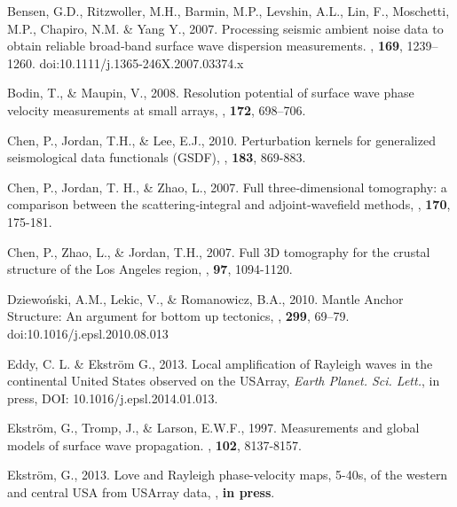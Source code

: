 \documentclass[referee]{gji}
\begin{document}
\begin{thebibliography}{}

	   Bensen, G.D., Ritzwoller, M.H., Barmin, M.P., Levshin, A.L., Lin, F., Moschetti, M.P., Chapiro, N.M. \& Yang Y., 2007. Processing seismic ambient noise data to obtain reliable broad‐band surface wave dispersion measurements. \textit{\gjras}, \textbf{169}, 1239–1260. doi:10.1111/j.1365-246X.2007.03374.x

	   Bodin, T., \& Maupin, V., 2008. Resolution potential of surface wave phase velocity measurements at small arrays, \textit{\gji}, \textbf{172}, 698–706.

	   Chen, P., Jordan, T.H., \& Lee, E.J., 2010. Perturbation kernels for generalized seismological data functionals (GSDF), \textit{\gji}, \textbf{183}, 869-883.

	   Chen, P., Jordan, T. H., \& Zhao, L., 2007. Full three‐dimensional tomography: a comparison between the scattering‐integral and adjoint‐wavefield methods, \textit{\gji}, \textbf{170}, 175-181.

	   Chen, P., Zhao, L., \& Jordan, T.H., 2007. Full 3D tomography for the crustal structure of the Los Angeles region, \textit{\bssa}, \textbf{97}, 1094-1120.

	   Dziewo\'{n}ski, A.M., Lekic, V., \& Romanowicz, B.A., 2010. Mantle Anchor Structure: An argument for bottom up tectonics, \textit{\epsl}, \textbf{299}, 69–79. doi:10.1016/j.epsl.2010.08.013

	   Eddy, C. L. \& Ekstr\"{o}m G., 2013. Local ampliﬁcation of Rayleigh waves in the continental United States observed on the USArray, \textit{Earth Planet. Sci. Lett.}, in press, DOI: 10.1016/j.epsl.2014.01.013.

	   Ekstr\"{o}m, G., Tromp, J., \& Larson, E.W.F., 1997. Measurements and global models of surface wave propagation. \textit{\jgr}, \textbf{102}, 8137-8157. 

	   Ekstr\"{o}m, G., 2013. Love and Rayleigh phase-velocity maps, 5-40s, of the western and central USA from USArray data, \textit{\epsl}, \textbf{in press}.


\end{thebibliography}
\end{document}
